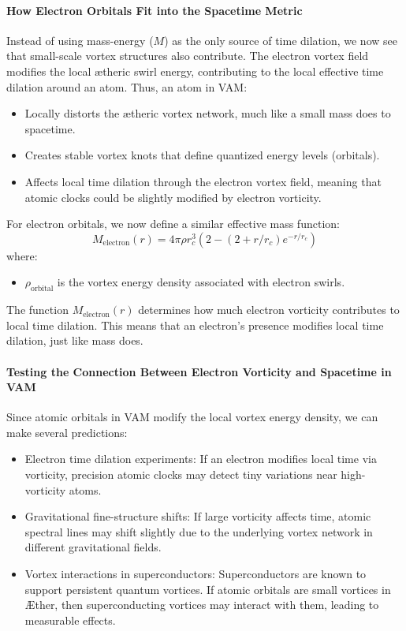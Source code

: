 \paragraph{How Electron Orbitals Fit into the Spacetime Metric}
Instead of using mass-energy ($M$) as the only source of time dilation, we now see that small-scale vortex structures also contribute.
The electron vortex field modifies the local ætheric swirl energy, contributing to the local effective time dilation around an atom.
Thus, an atom in VAM:
\begin{itemize}
    \item Locally distorts the ætheric vortex network, much like a small mass does to spacetime.
    \item Creates stable vortex knots that define quantized energy levels (orbitals).
    \item Affects local time dilation through the electron vortex field, meaning that atomic clocks could be slightly modified by electron vorticity.
\end{itemize}
For electron orbitals, we now define a similar effective mass function:
\begin{equation*}
    M_{\text{electron}}(r)=4 \pi \rho r_c^3  \left( 2 - (2 + r/r_c) e^{-r / r_c} \right)
\end{equation*}
where:
\begin{itemize}
    \item $\rho_{\text{orbital}}$ is the vortex energy density associated with electron swirls.
\end{itemize}
The function $M_{\text{electron}}(r)$ determines how much electron vorticity contributes to local time dilation.
This means that an electron’s presence modifies local time dilation, just like mass does.

\paragraph{Testing the Connection Between Electron Vorticity and Spacetime in VAM}
Since atomic orbitals in VAM modify the local vortex energy density, we can make several predictions:
\begin{itemize}
    \item Electron time dilation experiments: If an electron modifies local time via vorticity, precision atomic clocks may detect tiny variations near high-vorticity atoms.
    \item Gravitational fine-structure shifts: If large vorticity affects time, atomic spectral lines may shift slightly due to the underlying vortex network in different gravitational fields.
    \item Vortex interactions in superconductors: Superconductors are known to support persistent quantum vortices. If atomic orbitals are small vortices in Æther, then superconducting vortices may interact with them, leading to measurable effects.
\end{itemize}

